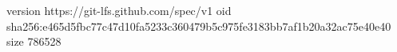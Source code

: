 version https://git-lfs.github.com/spec/v1
oid sha256:e465d5fbc77c47d10fa5233c360479b5c975fe3183bb7af1b20a32ac75e40e40
size 786528

